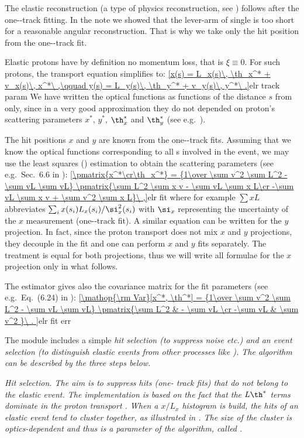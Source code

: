The elastic reconstruction (a type of physics reconstruction, see ) follows after the one--track fitting. In the note  we showed that the lever-arm of single  is too short for a reasonable angular reconstruction. That is why we take only the hit position from the one--track fit.

Elastic protons have by definition no momentum loss, that is $\xi \equiv 0$. For such protons, the transport equation  simplifies to:
\eqref{x(s) = L_x(s)\, \th_x^* + v_x(s)\, x^*\ ,\qquad y(s) = L_y(s)\, \th_y^* + v_y(s)\, y^*\ .}{elr track param}
We have written the optical functions as functions of the distance $s$ from  only, since in a very good approximation they do not depended on proton's scattering parameters $x^*$, $y^*$, $\th^*_x$ and $\th^*_y$ (see e.g.~).

The hit positions $x$ and $y$ are known from the one--track fits. Assuming that we know the optical functions corresponding to all s involved in the event, we may use the least squares () estimation to obtain the scattering parameters (see e.g.~Sec.~6.6 in ):
\eqref{\pmatrix{x^*\cr\th_x^*} = {1\over \sum v^2 \sum L^2 - \sum vL \sum vL} \pmatrix{\sum L^2 \sum x v - \sum vL \sum x L\cr -\sum vL \sum x v + \sum v^2 \sum x L}\ ,}{elr fit}
where for example $\sum x L$ abbreviates $\sum_{i} x(s_i) L_x(s_i) / \si_x^2(s_i)$ with $\si_x$ representing the uncertainty of the $x$ measurement (one--track fit). A similar equation can be written for the $y$ projection. In fact, since the proton transport  does not mix $x$ and $y$ projections, they decouple in the fit and one can perform $x$ and $y$ fits separately. The treatment is equal for both projections, thus we will write all formulae for the $x$ projection only in what follows.

The  estimator gives also the covariance matrix for the fit parameters (see e.g.~Eq.~(6.24) in ):
\eqref{\mathop{\rm Var}[x^*, \th^*] = {1\over \sum v^2 \sum L^2 - \sum vL \sum vL} \pmatrix{\sum L^2 & - \sum vL \cr -\sum vL & \sum v^2 }\ .
}{elr fit err}

The module includes a simple \em{hit selection} (to suppress noise etc.) and an \em{event selection} (to distinguish elastic events from other processes like ). The algorithm can be described by the three steps below.

\bitm
\itm \em{Hit selection}. The aim is to suppress hits (one- track fits) that do not belong to the elastic event. The implementation is based on the fact that the $L\th^*$ terms dominate in the proton transport 
. When a $x/L_x$ histogram is build, the hits of an elastic event tend to cluster together, as illustrated in . The size of the cluster is optics-dependent and thus is a parameter of the algorithm, called .

